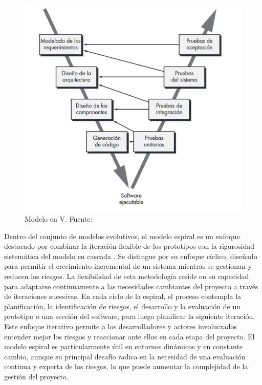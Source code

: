 \begin{figure}[!htb]
	\centering
	\includegraphics[width=\linewidth]{Figures/model-v.png}
	\caption{Modelo en V. Fuente: \cite{pressman2010ingenieria}}
\end{figure}

Dentro del conjunto de modelos evolutivos, el modelo espiral es un enfoque destacado por combinar la iteración flexible de los prototipos con la rigurosidad sistemática del modelo en cascada \cite{pressman2010ingenieria}. Se distingue por su enfoque cíclico, diseñado para permitir el crecimiento incremental de un sistema mientras se gestionan y reducen los riesgos. La flexibilidad de esta metodología reside en su capacidad para adaptarse continuamente a las necesidades cambiantes del proyecto a través de iteraciones sucesivas. En cada ciclo de la espiral, el proceso contempla la planificación, la identificación de riesgos, el desarrollo y la evaluación de un prototipo o una sección del software, para luego planificar la siguiente iteración. Este enfoque iterativo permite a los desarrolladores y actores involucrados entender mejor los riesgos y reaccionar ante ellos en cada etapa del proyecto. El modelo espiral es particularmente útil en entornos dinámicos y en constante cambio, aunque su principal desafío radica en la necesidad de una evaluación continua y experta de los riesgos, lo que puede aumentar la complejidad de la gestión del proyecto.

